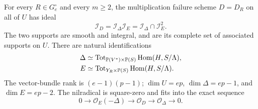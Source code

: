 \begin{theorem}
\label{thm:ramification-primary}
For every $R\in G_e^\circ$ and every $m\ge2$, the multiplication
failure scheme $D=D_R$ on all of $U$ has ideal
\begin{equation}\label{eq:ramification-primary-ideal}
 \mathcal I_D=\mathcal I_\Delta\mathcal I_E
             =\mathcal I_\Delta\cap\mathcal I_E^2.
\end{equation}
The two supports are smooth and integral, and are its complete set
of associated supports on $U$. There are natural identifications
\begin{align}
 \Delta&\simeq
 \operatorname{Tot}_{\mathbb P(V^*)\times\mathbb P(S)}
                     \operatorname{Hom}(H,S/\Lambda),
       \label{eq:delta-graph-bundle}\\
 E&\simeq
 \operatorname{Tot}_{Y_R\times\mathbb P(S)}
                     \operatorname{Hom}(H,S/\Lambda).
       \label{eq:embedded-graph-bundle}
\end{align}
The vector-bundle rank is $(e-1)(p-1)$; $\dim U=ep$,
$\dim\Delta=ep-1$, and $\dim E=ep-2$.
The nilradical is square-zero and fits into the exact sequence
\begin{equation}\label{eq:ramification-nil-sequence}
 0\longrightarrow\mathcal O_E(-\Delta)
 \longrightarrow\mathcal O_D
 \longrightarrow\mathcal O_\Delta\longrightarrow0.
\end{equation}
\end{theorem}
